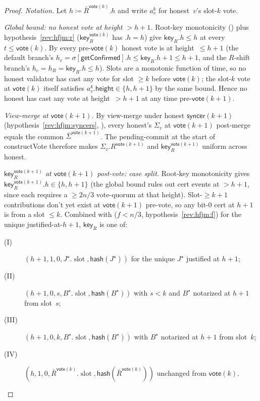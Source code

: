 \documentclass{article}
\newcommand{\slot}[0]{\ensuremath{\operatorname{\mathrm{slot}}}}
\newcommand{\height}{\mathsf{height}}
\newcommand{\hash}{\mathsf{hash}}
\newcommand{\key}{\mathsf{key}}
\newcommand{\syncer}{\mathsf{syncer}}
\newcommand{\vote}{\mathsf{vote}}
\newcommand{\comm}[1]{\bar{#1}}
\newcommand{\constructVote}{\textsf{constructVote}\xspace}
\newcommand{\getConfirmed}{\textsf{getConfirmed}\xspace}
\theoremstyle{plain}
\theoremstyle{definition}
\theoremstyle{remark}
\begin{document}
\begin{proof}
\emph{Notation.}
Let $h \coloneqq \comm{R}^{\vote(k)}.h$ and write $a^k_v$ for honest~$v$'s slot-$k$ vote.

\emph{Global bound: no honest vote at height $> h+1$.}
Root-key monotonicity () plus hypothesis~\ref{rev:hfjm:r} ($\key_R^{\vote(k)}$ has $.h = h$) give $\key_R.h \leq h$ at every $t \leq \vote(k)$. By  every pre-$\vote(k)$ honest vote is at height~$\leq h+1$ (the default branch's $h_c = \sigma[\getConfirmed].h \leq \key_R.h + 1 \leq h+1$, and the $R$-shift branch's $h_c = h_R = \key_R.h \leq h$). Slots are a monotonic function of time, so no honest validator has cast any vote for slot $\geq k$ before $\vote(k)$; the slot-$k$ vote at $\vote(k)$ itself satisfies $a^k_v.\height \in \{h, h+1\}$ by the same bound. Hence no honest has cast any vote at height~$> h+1$ at any time pre-$\vote(k+1)$.

\emph{View-merge at $\vote(k+1)$.}
By view-merge under honest $\syncer(k+1)$ (hypothesis~\ref{rev:hfjm:syncers}, ), every honest's $\Sigma_v$ at $\vote(k+1)$ post-merge equals the common $\comm{\Sigma}^{\vote(k+1)}$. The pending-commit at the start of \constructVote{} therefore makes $\Sigma_v.R^{\vote(k+1)}$ and $\key_R^{\vote(k+1)}$ uniform across honest.

\emph{$\key_R^{\vote(k+1)}$ at $\vote(k+1)$ post-vote: case split.}
Root-key monotonicity gives $\key_R^{\vote(k+1)}.h \in \{h, h+1\}$ (the global bound rules out cert events at $> h+1$, since each requires a $\geq 2n/3$ vote-quorum at that height). Slot-$\geq k+1$ contributions don't yet exist at $\vote(k+1)$ pre-vote, so any bit-$0$ cert at $h+1$ is from a slot $\leq k$. Combined with  ($f<n/3$, hypothesis~\ref{rev:hfjm:f}) for the unique justified-at-$h+1$, $\key_R$ is one of:
\begin{description}
  \item[(I)] $(h+1, 1, 0, J^\star.\slot, \hash(J^\star))$ for the unique $J^\star$ justified at $h+1$;
  \item[(II)] $(h+1, 0, s, B^\star.\slot, \hash(B^\star))$ with $s < k$ and $B^\star$ notarized at $h+1$ from slot~$s$;
  \item[(III)] $(h+1, 0, k, B^\star.\slot, \hash(B^\star))$ with $B^\star$ notarized at $h+1$ from slot~$k$;
  \item[(IV)] $(h, 1, 0, \comm{R}^{\vote(k)}.\slot, \hash(\comm{R}^{\vote(k)}))$ unchanged from $\vote(k)$.
\end{description}


\end{proof}
\end{document}
